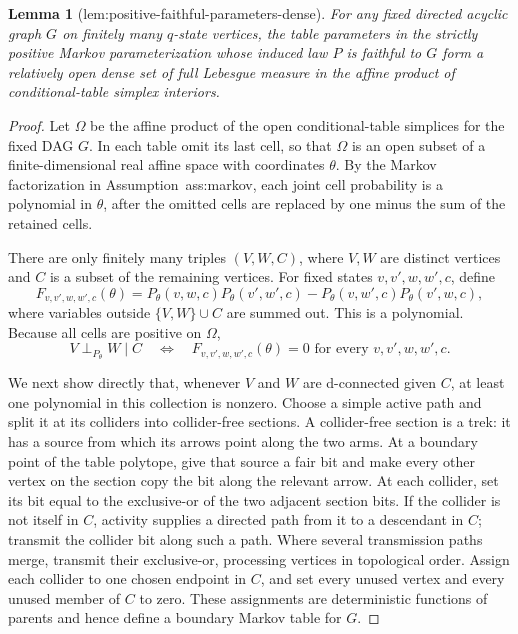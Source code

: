 \documentclass{article}
\newtheorem{lemma}{Lemma}
\begin{document}
\begin{lemma}[lem:positive-faithful-parameters-dense]\label{lem:positive-faithful-parameters-dense}
For any fixed directed acyclic graph \(G\) on finitely many \(q\)-state vertices, the table parameters in the strictly positive Markov parameterization whose induced law \(P\) is faithful to \(G\) form a relatively open dense set of full Lebesgue measure in the affine product of conditional-table simplex interiors.
\end{lemma}
\begin{proof}
Let \(\Omega\) be the affine product of the open conditional-table simplices for the fixed DAG \(G\).  In each table omit its last cell, so that \(\Omega\) is an open subset of a finite-dimensional real affine space with coordinates \(\theta\).  By the Markov factorization in Assumption~\textnormal{ass:markov}, each joint cell probability is a polynomial in \(\theta\), after the omitted cells are replaced by one minus the sum of the retained cells.

There are only finitely many triples \((V,W,C)\), where \(V,W\) are distinct vertices and \(C\) is a subset of the remaining vertices.  For fixed states \(v,v',w,w',c\), define
\[
 F_{v,v',w,w',c}(\theta)
 =P_\theta(v,w,c)P_\theta(v',w',c)
  -P_\theta(v,w',c)P_\theta(v',w,c),
\]
where variables outside \(\{V,W\}\cup C\) are summed out.  This is a polynomial.  Because all cells are positive on \(\Omega\),
\[
 V\mathrel{\perp}_{P_\theta}W\mid C
 \quad\Longleftrightarrow\quad
 F_{v,v',w,w',c}(\theta)=0
 \text{ for every }v,v',w,w',c.
\]

We next show directly that, whenever \(V\) and \(W\) are d-connected given \(C\), at least one polynomial in this collection is nonzero.  Choose a simple active path and split it at its colliders into collider-free sections.  A collider-free section is a trek: it has a source from which its arrows point along the two arms.  At a boundary point of the table polytope, give that source a fair bit and make every other vertex on the section copy the bit along the relevant arrow.  At each collider, set its bit equal to the exclusive-or of the two adjacent section bits.  If the collider is not itself in \(C\), activity supplies a directed path from it to a descendant in \(C\); transmit the collider bit along such a path.  Where several transmission paths merge, transmit their exclusive-or, processing vertices in topological order.  Assign each collider to one chosen endpoint in \(C\), and set every unused vertex and every unused member of \(C\) to zero.  These assignments are deterministic functions of parents and hence define a boundary Markov table for \(G\).


\end{proof}
\end{document}
